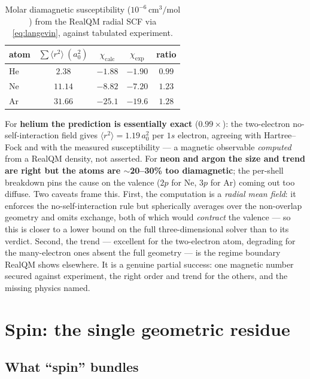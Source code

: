 \documentclass[11pt]{article}
\begin{document}
\begin{table}[h]
\centering
\begin{tabular}{lcccc}
\toprule
atom & $\sum\langle r^2\rangle\ (a_0^2)$ & $\chi_{\text{calc}}$ & $\chi_{\text{exp}}$ & ratio \\
\midrule
He & $2.38$  & $-1.88$ & $-1.90$ & $0.99$ \\
Ne & $11.14$ & $-8.82$ & $-7.20$ & $1.23$ \\
Ar & $31.66$ & $-25.1$ & $-19.6$ & $1.28$ \\
\bottomrule
\end{tabular}
\caption{Molar diamagnetic susceptibility ($10^{-6}\,\mathrm{cm^3/mol}$) from the RealQM radial SCF via
\eqref{eq:langevin}, against tabulated experiment.}
\label{tab:dia}
\end{table}

For \textbf{helium the prediction is essentially exact} ($0.99\times$): the two-electron no-self-interaction field
gives $\langle r^2\rangle=1.19\,a_0^2$ per $1s$ electron, agreeing with Hartree--Fock and with the measured
susceptibility --- a magnetic observable \emph{computed} from a RealQM density, not asserted. For \textbf{neon and
argon the size and trend are right but the atoms are $\sim$20--30\% too diamagnetic}; the per-shell breakdown
pins the cause on the valence ($2p$ for Ne, $3p$ for Ar) coming out too diffuse. Two caveats frame this. First,
the computation is a \emph{radial mean field}: it enforces the no-self-interaction rule but spherically averages
over the non-overlap geometry and omits exchange, both of which would \emph{contract} the valence --- so this is
closer to a lower bound on the full three-dimensional solver than to its verdict. Second, the trend --- excellent
for the two-electron atom, degrading for the many-electron ones absent the full geometry --- is the regime
boundary RealQM shows elsewhere. It is a genuine partial success: one magnetic number secured against experiment,
the right order and trend for the others, and the missing physics named.

\section{Spin: the single geometric residue}
\label{sec:spin}

\subsection{What ``spin'' bundles}
\end{document}
